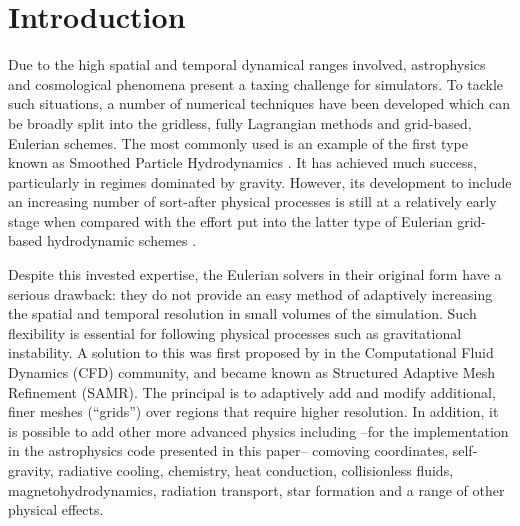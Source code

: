 
\section{Introduction}\label{sec.intro}

Due to the high spatial and temporal dynamical ranges involved, astrophysics and cosmological phenomena present a taxing challenge for simulators. To tackle such situations, a number of numerical techniques have been developed which can be broadly split into the gridless, fully Lagrangian methods and grid-based, Eulerian schemes. The most commonly used is an example of the first type known as Smoothed Particle Hydrodynamics \citep[SPH;][]{Lucy77, SPH}. It has achieved much success, particularly in regimes dominated by gravity.
However, its development to include an increasing number of sort-after physical processes is still at a relatively early stage when compared with the effort put into the latter type of Eulerian grid-based hydrodynamic schemes \citep[e.g.,][]{laney-1998, toro-1997, Woodward84}.

Despite this invested expertise, the Eulerian solvers in their original form have a serious drawback: they do not provide an easy method of adaptively increasing the spatial and temporal resolution in small volumes of the simulation. Such flexibility is essential for following physical processes such as gravitational instability. 
A solution to this was first proposed by \citet{Berger89} in the Computational Fluid Dynamics (CFD) community, and became known as Structured Adaptive Mesh Refinement (SAMR). The principal is to adaptively add and modify additional, finer meshes (``grids'') over regions that require higher resolution. In addition, it is possible to add other more advanced physics including --for the implementation in the astrophysics code presented in this paper-- comoving coordinates, self-gravity, radiative cooling, chemistry, heat conduction, collisionless fluids, magnetohydrodynamics, radiation transport, star formation and a range of other physical effects.

